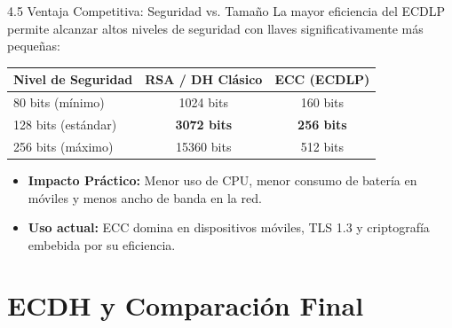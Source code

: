 \documentclass{beamer}
\begin{document}
\begin{frame}{4.5 Ventaja Competitiva: Seguridad vs. Tamaño}
    La mayor eficiencia del ECDLP permite alcanzar altos niveles de seguridad con llaves significativamente más pequeñas:
    \begin{table}[]
        \centering
        \begin{tabular}{|l|c|c|}
        \hline
        \textbf{Nivel de Seguridad} & \textbf{RSA / DH Clásico} & \textbf{ECC (ECDLP)} \\ \hline
        80 bits (mínimo) & 1024 bits & 160 bits \\ \hline
        128 bits (estándar) & \textbf{3072 bits} & \textbf{256 bits} \\ \hline
        256 bits (máximo) & 15360 bits & 512 bits \\ \hline
        \end{tabular}
    \end{table}
    \begin{itemize}
        \item \textbf{Impacto Práctico:} Menor uso de CPU, menor consumo de batería en móviles y menos ancho de banda en la red.
        \item \textbf{Uso actual:} ECC domina en dispositivos móviles, TLS 1.3 y criptografía embebida por su eficiencia.
    \end{itemize}
\end{frame}

\section{ECDH y Comparación Final}
\end{document}
